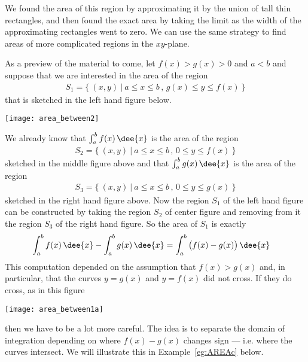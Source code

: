 We found the area of this region by approximating it by the union of tall thin
rectangles,
and then found the exact area by taking the limit as the width of the approximating
rectangles went to zero. We can use the same strategy to find areas of more
complicated regions in the $xy$-plane.


As a preview of the material to come, let $f(x)>g(x)>0$ and $a<b$ and suppose that we are
interested in the area of the region
\begin{align*}
S_1=\big\{\ (x,y)\ \big|\ a\le x\le b\,,\, g(x)\le y\le f(x)\ \big\}
\end{align*}
that is sketched in the left hand figure below.
\begin{wfig}
 \centering
\texttt{[image: area\_between2]}
\end{wfig}
We already know that $\int_a^b f(x)\,\dee{x}$ is the area of the region
\begin{align*}
S_2=\big\{\ (x,y)\ \big|\ a\le x\le b\,,\, 0\le y\le f(x)\ \big\}
\end{align*}
sketched in the middle figure above and that $\int_a^b g(x)\,\dee{x}$ is the area of the
region
\begin{align*}
S_3=\big\{\ (x,y)\ \big|\ a\le x\le b\,,\, 0\le y\le g(x)\ \big\}
\end{align*}
sketched in the right hand figure above. Now the region $S_1$ of the left hand figure
can be constructed by taking the region $S_2$ of center figure and removing from it the
region $S_3$ of the right hand figure. So the area of $S_1$ is exactly
\begin{align*}
  \int_a^b f(x)\,\dee{x} -  \int_a^b g(x)\,\dee{x}
  &=  \int_a^b \big(f(x)-g(x)\big)\,\dee{x}
\end{align*}
This computation depended on the assumption that $f(x)>g(x)$ and,
in particular, that the curves $y=g(x)$ and $y=f(x)$ did not cross.
If they do cross, as in this figure
\begin{efig}
 \centering
\texttt{[image: area\_between1a]}
\end{efig}
then we have to be a lot more careful. The idea is to separate the domain of
integration depending on where $f(x) - g(x)$ changes sign --- i.e. where the curves
intersect. We will illustrate this in Example~\ref{eg:AREAc} below.


